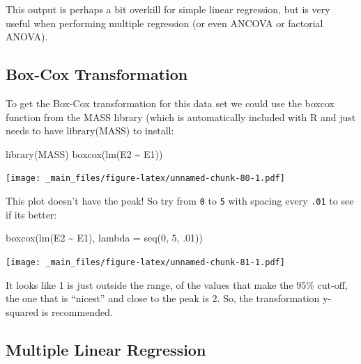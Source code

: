\documentclass[
]{book}
\newenvironment{Shaded}{\begin{snugshade}}{\end{snugshade}}
\newcommand{\AttributeTok}[1]{\textcolor[rgb]{0.77,0.63,0.00}{#1}}
\newcommand{\DecValTok}[1]{\textcolor[rgb]{0.00,0.00,0.81}{#1}}
\newcommand{\FunctionTok}[1]{\textcolor[rgb]{0.00,0.00,0.00}{#1}}
\newcommand{\NormalTok}[1]{#1}
\newcommand{\SpecialCharTok}[1]{\textcolor[rgb]{0.00,0.00,0.00}{#1}}
\begin{document}
This output is perhaps a bit overkill for simple linear regression, but is very useful when performing multiple regression (or even ANCOVA or factorial ANOVA).

\hypertarget{box-cox-transformation}{%
\subsection{Box-Cox Transformation}\label{box-cox-transformation}}

To get the Box-Cox transformation for this data set we could use the boxcox function from the MASS library (which is automatically included with R and just needs to have library(MASS) to install:

\begin{Shaded}
\begin{Highlighting}[]
\FunctionTok{library}\NormalTok{(MASS)}
\FunctionTok{boxcox}\NormalTok{(}\FunctionTok{lm}\NormalTok{(E2 }\SpecialCharTok{\textasciitilde{}}\NormalTok{ E1))}
\end{Highlighting}
\end{Shaded}

\texttt{[image: \_main\_files/figure-latex/unnamed-chunk-80-1.pdf]}

This plot doesn't have the peak! So try from \texttt{0} to \texttt{5} with spacing every \texttt{.01} to see if its better:

\begin{Shaded}
\begin{Highlighting}[]
\FunctionTok{boxcox}\NormalTok{(}\FunctionTok{lm}\NormalTok{(E2 }\SpecialCharTok{\textasciitilde{}}\NormalTok{ E1), }\AttributeTok{lambda =} \FunctionTok{seq}\NormalTok{(}\DecValTok{0}\NormalTok{, }\DecValTok{5}\NormalTok{, .}\DecValTok{01}\NormalTok{))}
\end{Highlighting}
\end{Shaded}

\texttt{[image: \_main\_files/figure-latex/unnamed-chunk-81-1.pdf]}

It looks like 1 is just outside the range, of the values that make the 95\% cut-off, the one that is ``nicest'' and close to the peak is 2. So, the transformation y-squared is recommended.

\hypertarget{multiple-linear-regression}{%
\subsection{Multiple Linear Regression}\label{multiple-linear-regression}}
\end{document}
